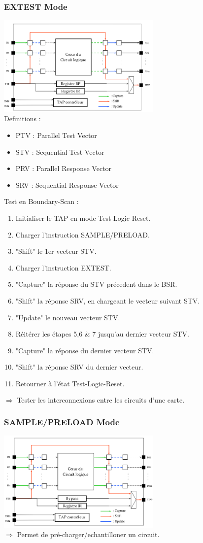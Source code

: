 \documentclass[10pt]{article}
\begin{document}
\begin{multicols}{2}
  \subsubsection{EXTEST Mode}
  \includegraphics[width=8cm]{extest.png}\\
  Definitions :
  \begin{itemize}
    \itemsep0em
    \item PTV : Parallel Test Vector
    \item STV : Sequential Test Vector
    \item PRV : Parallel Response Vector
    \item SRV : Sequential Response Vector
  \end{itemize}
  Test en Boundary-Scan :
  \begin{enumerate}
    \itemsep0em
    \item Initialiser le TAP en mode Test-Logic-Reset.
    \item Charger l'instruction SAMPLE/PRELOAD.
    \item "Shift" le 1er vecteur STV.
    \item Charger l'instruction EXTEST.
    \item "Capture" la réponse du STV précedent dans le BSR.
    \item "Shift" la réponse SRV, en chargeant le vecteur suivant STV.
    \item "Update" le nouveau vecteur STV.
    \item Réitérer les étapes 5,6 \& 7 jusqu'au dernier vecteur STV.
    \item "Capture" la réponse du dernier vecteur STV.
    \item "Shift" la réponse SRV du dernier vecteur.
    \item Retourner à l'état Test-Logic-Reset.
  \end{enumerate}
  $\Rightarrow$ Tester les interconnexions entre les circuits d'une carte.
  \subsubsection{SAMPLE/PRELOAD Mode}
  \includegraphics[width=8cm]{sample.png}\\
  $\Rightarrow$ Permet de pré-charger/echantilloner un circuit.

\end{multicols}
\end{document}
